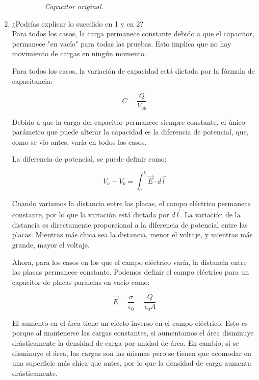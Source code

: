 \documentclass[12pt]{report}
\begin{document}
\begin{enumerate}
\begin{enumerate}
\begin{figure}[h]
\begin{minipage}[h]{0.4\textwidth}
          \textit{Capacitor original.} 
       \end{minipage}
      \end{figure}
        
\newpage

    \end{enumerate}
    \item ¿Podrías explicar lo sucedido en 1 y en 2?\\[6pt] 
    Para todos los casos, la carga permanece constante debido a que el capacitor, permanece "en vacío" para todas las pruebas. Esto implica que no hay movimiento de cargas en ningún momento.

    Para todos los casos, la variación de capacidad está dictada por la fórmula de capacitancia:

\[C=\frac{Q}{V_{ab}}\]

    Debido a que la carga del capacitor permanece siempre constante, el único parámetro que puede alterar la capacidad es la diferencia de potencial, que, como se vio antes, varía en todos los casos.
    
    La diferencia de potencial, se puede definir como:
    
\[V_a-V_b=\int_{a}^{b}\vec{E}\cdot d \vec{l}\]

    Cuando variamos la distancia entre las placas, el campo eléctrico permanece constante, por lo que la variación está dictada por \(d \vec{l}\). La variación de la distancia es directamente proporcional a la diferencia de potencial entre las placas. Mientras más chica sea la distancia, menor el voltaje, y mientras más grande, mayor el voltaje.

    Ahora, para los casos en los que el campo eléctrico varía, la distancia entre las placas permanece constante. Podemos definir el campo eléctrico para un capacitor de placas paralelas en vacio como:
    
\[\vec{E}=\frac{\sigma}{\epsilon_0}=\frac{Q}{\epsilon_0 A}\]

    El aumento en el área tiene un efecto inverso en el campo eléctrico. Esto es porque al mantenerse las cargas constantes, si aumentamos el área disminuye drásticamente la densidad de carga por unidad de área. En cambio, si se disminuye el área, las cargas son las mismas pero se tienen que acomodar en una superficie más chica que antes, por lo que la densidad de carga aumenta drásticamente.

\end{enumerate}
\end{document}
